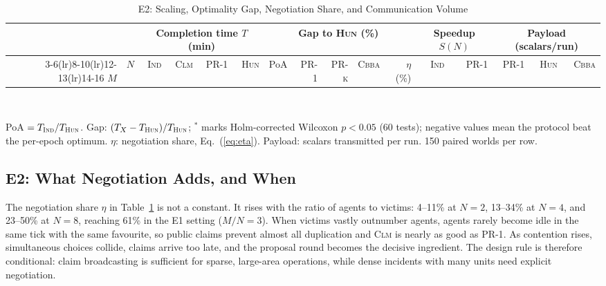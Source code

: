 \documentclass[conference]{IEEEtran}
\newcommand{\IND}{\textsc{Ind}}
\newcommand{\CLM}{\textsc{Clm}}
\newcommand{\PRone}{\textsc{PR-1}}
\newcommand{\PRk}{\textsc{PR-k}}
\newcommand{\HUN}{\textsc{Hun}}
\newcommand{\CBBA}{\textsc{Cbba}}
\begin{document}
\begin{table}[!t]
\caption{E2: Scaling, Optimality Gap, Negotiation Share, and Communication Volume}
\label{tab:scaling}
\centering
\footnotesize
\setlength{\tabcolsep}{3.6pt}
\begin{tabular}{@{}rrrrrrrrrrrrrrrr@{}}
\toprule
& & \multicolumn{4}{c}{Completion time $T$ (min)} & & \multicolumn{3}{c}{Gap to \HUN{} (\%)} & & \multicolumn{2}{c}{Speedup $S(N)$} & \multicolumn{3}{c}{Payload (scalars/run)} \\
\cmidrule(lr){3-6}\cmidrule(lr){8-10}\cmidrule(lr){12-13}\cmidrule(lr){14-16}
$M$ & $N$ & \IND{} & \CLM{} & \PRone{} & \HUN{} & PoA & \PRone{} & \PRk{} & \CBBA{} & $\eta$ (\%) & \IND{} & \PRone{} & \PRone{} & \HUN{} & \CBBA{} \\
\midrule

\end{tabular}\\[2pt]
\parbox{\textwidth}{\scriptsize PoA $=T_{\IND}/T_{\HUN}$. Gap: $(T_X-T_{\HUN})/T_{\HUN}$; $^{*}$ marks Holm-corrected Wilcoxon $p<0.05$ (60 tests); negative values mean the protocol beat the per-epoch optimum. $\eta$: negotiation share, Eq.~(\ref{eq:eta}). Payload: scalars transmitted per run. 150 paired worlds per row.}
\end{table}

\subsection{E2: What Negotiation Adds, and When}
The negotiation share $\eta$ in Table~\ref{tab:scaling} is not a constant. It rises with the ratio of agents to victims: 4--11\% at $N=2$, 13--34\% at $N=4$, and 23--50\% at $N=8$, reaching 61\% in the E1 setting ($M/N=3$). When victims vastly outnumber agents, agents rarely become idle in the same tick with the same favourite, so public claims prevent almost all duplication and \CLM{} is nearly as good as \PRone{}. As contention rises, simultaneous choices collide, claims arrive too late, and the proposal round becomes the decisive ingredient. The design rule is therefore conditional: claim broadcasting is sufficient for sparse, large-area operations, while dense incidents with many units need explicit negotiation.
\end{document}
